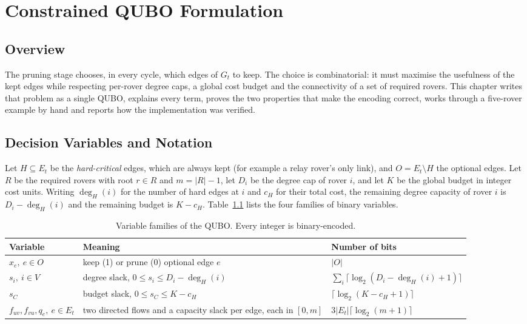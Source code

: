 \chapter{Constrained QUBO Formulation}
\label{ch:qubo}

\section{Overview}

The pruning stage chooses, in every cycle, which edges of $G_t$ to keep. The
choice is combinatorial: it must maximise the usefulness of the kept edges
while respecting per-rover degree caps, a global cost budget and the
connectivity of a set of required rovers. This chapter writes that problem as
a single QUBO, explains every term, proves the two properties that make the
encoding correct, works through a five-rover example by hand and reports how
the implementation was verified.

\section{Decision Variables and Notation}

Let $H\subseteq E_t$ be the \emph{hard-critical} edges, which are always kept
(for example a relay rover's only link), and $O=E_t\setminus H$ the optional
edges. Let $R$ be the required rovers with root $r\in R$ and $m=|R|-1$, let
$D_i$ be the degree cap of rover $i$, and let $K$ be the global budget in
integer cost units. Writing $\deg_H(i)$ for the number of hard edges at $i$
and $c_H$ for their total cost, the remaining degree capacity of rover $i$ is
$D_i-\deg_H(i)$ and the remaining budget is $K-c_H$.
Table~\ref{tab:qubo:vars} lists the four families of binary variables.

\begin{table}[htbp]
\centering
\caption{Variable families of the QUBO. Every integer is binary-encoded.}
\label{tab:qubo:vars}
\small
\begin{tabularx}{\linewidth}{@{}l X l@{}}
\toprule
Variable & Meaning & Number of bits \\
\midrule
$x_e,\ e\in O$ & keep (1) or prune (0) optional edge $e$ & $|O|$ \\
$s_i,\ i\in V$ & degree slack, $0\le s_i\le D_i-\deg_H(i)$ & $\sum_i\lceil\log_2(D_i-\deg_H(i)+1)\rceil$ \\
$s_C$ & budget slack, $0\le s_C\le K-c_H$ & $\lceil\log_2(K-c_H+1)\rceil$ \\
$f_{uv},f_{vu},q_e,\ e\in E_t$ & two directed flows and a capacity slack per edge, each in $[0,m]$ & $3|E_t|\lceil\log_2(m+1)\rceil$ \\
\bottomrule
\end{tabularx}
\end{table}

